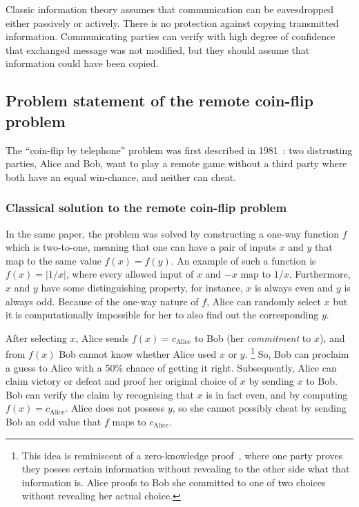 \documentclass[oneside,a4paper]{article}
\begin{document}

Classic information theory assumes that communication can be eavesdropped either passively or actively. There is no protection against copying transmitted information. Communicating parties can verify with high degree of confidence that exchanged message was not modified, but they should assume that information could have been copied. 


\subsection{Problem statement of the remote coin-flip problem}
The ``coin-flip by telephone'' problem was first described in 1981~\cite{blum1981coin}: two distrusting parties, Alice and Bob, want to play a remote game without a third party where both have an equal win-chance, and neither can cheat.

\subsubsection{Classical solution to the remote coin-flip problem}
In the same paper, the problem was solved by constructing a one-way function $f$ which is two-to-one, meaning that one can have a pair of inputs $x$ and $y$ that map to the same value $f(x)=f(y)$. An example of such a function is $f(x) =|1/x|$, where every allowed input of $x$ and $-x$ map to $1/x$. Furthermore, $x$ and $y$ have some distinguishing property, for instance, $x$ is always even and $y$ is always odd. Because of the one-way nature of $f$, Alice can randomly select $x$ but it is computationally impossible for her to also find out the corresponding $y$.

After selecting $x$, Alice sends $f(x)=c_{\text{Alice}}$ to Bob (her \textit{commitment} to $x$), and from $f(x)$ Bob cannot know whether Alice used $x$ or $y$.
\footnote{
    This idea is reminiscent of a zero-knowledge proof~\cite{goldwasser1989knowledge}, where one party proves they posses certain information without revealing to the other side what that information is.
    Alice proofs to Bob she committed to one of two choices without revealing her actual choice.
}
So, Bob can proclaim a guess to Alice with a 50\% chance of getting it right.
Subsequently, Alice can claim victory or defeat and proof her original choice of $x$ by sending $x$ to Bob.
Bob can verify the claim by recognising that $x$ is in fact even, and by computing $f(x)=c_{\text{Alice}}$.
Alice does not possess $y$, so she cannot possibly cheat by sending Bob an odd value that $f$ maps to $c_{\text{Alice}}$.
\end{document}
